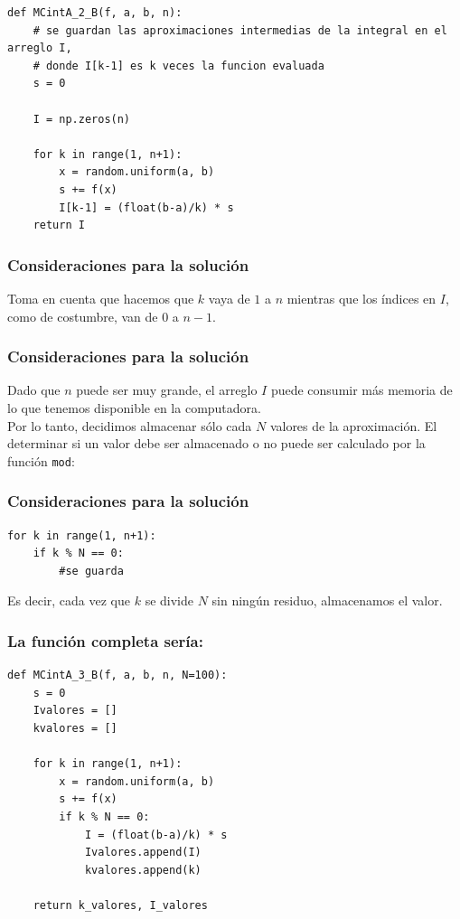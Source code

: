 \begin{frame}
\begin{lstlisting}[caption=Código para el ejercicio, style=codigopython]
def MCintA_2_B(f, a, b, n):
    # se guardan las aproximaciones intermedias de la integral en el arreglo I,
    # donde I[k-1] es k veces la funcion evaluada
    s = 0

    I = np.zeros(n)

    for k in range(1, n+1):
        x = random.uniform(a, b)
        s += f(x)
        I[k-1] = (float(b-a)/k) * s
    return I
\end{lstlisting}
\end{frame}
\begin{frame}
\frametitle{Consideraciones para la solución}
Toma en cuenta que hacemos que $k$ vaya de $1$ a $n$ mientras que los índices en $I$, como de costumbre, van de $0$ a $n-1$.
\end{frame}
\begin{frame}
\frametitle{Consideraciones para la solución}
Dado que $n$ puede ser muy grande, el arreglo $I$ puede consumir más memoria de lo que tenemos disponible en la computadora.
\\
\bigskip
Por lo tanto, decidimos almacenar sólo cada $N$ valores de la aproximación. El determinar si un valor debe ser almacenado o no puede ser calculado por la función \texttt{mod}:
\end{frame}
\begin{frame}
\frametitle{Consideraciones para la solución}
\begin{lstlisting}[caption=Almacenamiento de valores, style=codigopython]
for k in range(1, n+1):
    if k % N == 0:
    	#se guarda
\end{lstlisting}
Es decir, cada vez que $k$ se divide $N$ sin ningún residuo, almacenamos el valor.
\end{frame}
\begin{frame}
\frametitle{La función completa sería:}
\begin{lstlisting}[caption=Código completo para el ejercicio, style=codigopython]
def MCintA_3_B(f, a, b, n, N=100):
    s = 0
    Ivalores = []
    kvalores = []
    
    for k in range(1, n+1):
        x = random.uniform(a, b)
        s += f(x)
        if k % N == 0:
            I = (float(b-a)/k) * s
            Ivalores.append(I)
            kvalores.append(k)
    
    return k_valores, I_valores
\end{lstlisting}
\end{frame}
